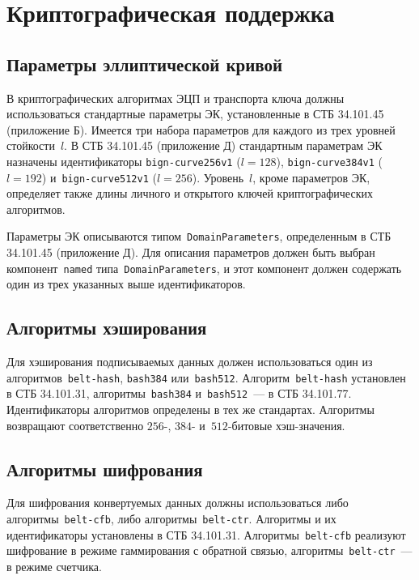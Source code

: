 \chapter{Криптографическая поддержка}\label{CRYPTO}

\section{Параметры эллиптической кривой}\label{CRYPTO.Params}

В криптографических алгоритмах ЭЦП и транспорта ключа должны
использоваться стандартные параметры ЭК, 
установленные в СТБ 34.101.45 (приложение Б). 
%
Имеется три набора параметров для каждого из трех уровней стойкости~$l$.
%
В СТБ 34.101.45 (приложение Д) стандартным параметрам ЭК назначены 
идентификаторы 
\texttt{bign-curve256v1} ($l=128$), 
\texttt{bign-curve384v1} ($l=192$)
и~\texttt{bign-curve512v1} ($l=256$).
%
Уровень~$l$, кроме параметров ЭК, определяет также длины личного и 
открытого ключей криптографических алгоритмов.

Параметры ЭК описываются типом~\texttt{DomainParameters},
определенным в СТБ 34.101.45 (приложение Д). Для описания параметров
должен быть выбран компонент~\texttt{named} типа~\texttt{DomainParameters},
и этот компонент должен содержать один из трех указанных выше
идентификаторов.

\section{Алгоритмы хэширования}\label{CRYPTO.Hash}

Для хэширования подписываемых данных должен использоваться один из
алгоритмов~\texttt{belt-hash}, \texttt{bash384} или~\texttt{bash512}.
%
Алгоритм~\texttt{belt-hash} установлен в СТБ 34.101.31,
алгоритмы~\texttt{bash384} и~\texttt{bash512}~--- в СТБ 34.101.77.
%
Идентификаторы алгоритмов определены в тех же стандартах.
%
Алгоритмы возвращают соответственно $256$-, $384$- 
и~$512$-битовые хэш-значения.

\section{Алгоритмы шифрования}\label{CRYPTO.Encr}

Для шифрования конвертуемых данных должны использоваться либо
алгоритмы~\texttt{belt-cfb}, либо алгоритмы~\texttt{belt-ctr}.
%
Алгоритмы и их идентификаторы установлены в СТБ 34.101.31.
%
Алгоритмы~\texttt{belt-cfb} реализуют шифрование в режиме гаммирования с 
обратной связью, алгоритмы~\texttt{belt-ctr}~--- в режиме счетчика.

